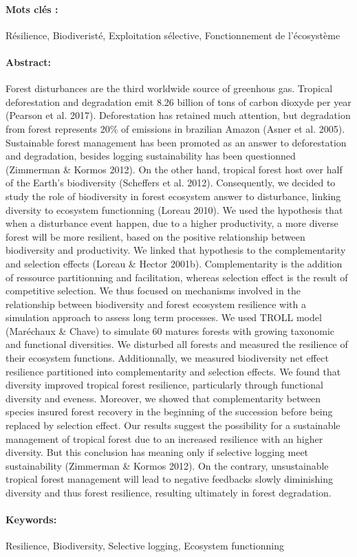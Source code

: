 {\paragraph{Mots clés :} Résilience, Biodiveristé, Exploitation sélective, Fonctionnement de l'écosystème
\paragraph{Abstract:}
Forest disturbances are the third worldwide source of greenhous gas. Tropical deforestation and degradation emit 8.26 billion of tons of carbon dioxyde per year (Pearson et al. 2017). Deforestation has retained much attention, but degradation from forest represents 20\% of emissions in brazilian Amazon (Asner et al. 2005). Sustainable forest management has been promoted as an answer to deforestation and degradation, besides logging sustainability has been questionned (Zimmerman \& Kormos 2012). On the other hand, tropical forest host over half of the Earth’s biodiversity (Scheffers et al. 2012). Consequently, we decided to study the role of biodiversity in forest ecosystem answer to disturbance, linking diversity to ecosystem functionning (Loreau 2010). We used the hypothesis that when a disturbance event happen, due to a higher productivity, a more diverse forest will be more resilient, based on the positive relationship between biodiversity and productivity. We linked that hypothesis to the complementarity and selection effects (Loreau \& Hector 2001b). Complementarity is the addition of ressource partitionning and facilitation, whereas selection effect is the result of competitive selection. We thus focused on mechanisms involved in the relationship between biodiversity and forest ecosystem resilience with a simulation approach to assess long term processes. We used TROLL model (Maréchaux \& Chave) to simulate 60 matures forests with growing taxonomic and functional diversities. We disturbed all forests and measured the resilience of their ecosystem functions. Additionnally, we measured biodiversity net effect resilience partitioned into complementarity and selection effects. We found that diversity improved tropical forest resilience, particularly through functional diversity and eveness. Moreover, we showed that complementarity between species insured forest recovery in the beginning of the succession before being replaced by selection effect. Our results suggest the possibility for a sustainable management of tropical forest due to an increased resilience with an higher diversity. But this conclusion has meaning only if selective logging meet sustainability (Zimmerman \& Kormos 2012). On the contrary, unsustainable tropical forest management will lead to negative feedbacks slowly diminishing diversity and thus forest resilience, resulting ultimately in forest degradation.
\paragraph{Keywords:}Resilience, Biodiversity, Selective logging, Ecosystem functionning
}

